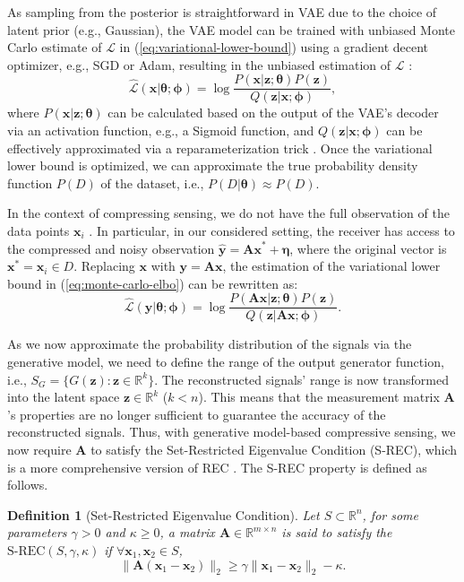 \documentclass[conference, 10pt]{IEEEtran}
\newtheorem{definition}{Definition}
\begin{document}
As sampling from the posterior is straightforward in VAE due to the choice of latent prior (e.g., Gaussian), the VAE model can be trained with unbiased Monte Carlo estimate of $\mathcal{L}$ in (\ref{eq:variational-lower-bound}) using a gradient decent optimizer, e.g., SGD or Adam, resulting in the unbiased estimation of $\mathcal{L}$ \cite{kingma2013auto}:
\begin{equation}
\label{eq:monte-carlo-elbo}
\mathcal{\hat{L}}(\mathbf{x}|\bm{\theta}; \bm{\phi}) = \log \frac{P(\mathbf{x}|\mathbf{z}; \bm{\theta}) P(\mathbf{z})}{Q (\mathbf{z}|\mathbf{x}; \bm{\phi})},
\end{equation}
where $P(\mathbf{x}|\mathbf{z}; \bm{\theta})$ can be calculated based on the output of the VAE's decoder via an activation function, e.g., a Sigmoid function, and $Q(\mathbf{z}|\mathbf{x}; \bm{\phi})$ can be effectively approximated via a reparameterization trick \cite{kingma2013auto}.
Once the variational lower bound is optimized, we can approximate the true probability density function $P(D)$ of the dataset, i.e., $P(D|\bm{\theta}) \approx P(D)$. 

In the context of compressing sensing, we do not have the full observation of the data points $\mathbf{x}_i$ \cite{foucart2013invitation}. In particular, in our considered setting, the receiver has access to the compressed and noisy observation $\mathbf{\hat{y}} = \mathbf{Ax}^* + \bm{\eta}$, where the original vector is $\mathbf{x}^* = \mathbf{x}_i \in D$. Replacing $\mathbf{x}$ with $\mathbf{y} = \mathbf{Ax}$, the estimation of the variational lower bound in (\ref{eq:monte-carlo-elbo}) can be rewritten as:
\begin{equation}
\mathcal{\hat{L}}(\mathbf{y}|\bm{\theta};\bm{\phi}) = \log \frac{P(\mathbf{Ax}|\mathbf{z};\bm{\theta}) P(\mathbf{z})}{Q(\mathbf{z}|\mathbf{Ax};\bm{\phi})}.
\end{equation}

As we now approximate the probability distribution of the signals via the generative model, we need to define the range of the output generator function, i.e., $S_G = \{G(\mathbf{z}): \mathbf{z} \in \mathbb{R}^k\}$.
The reconstructed signals' range is now transformed into the latent space $\mathbf{z} \in \mathbb{R}^k$ ($k < n$). This means that the measurement matrix $\mathbf{A}$'s properties are no longer sufficient to guarantee the accuracy of the reconstructed signals. Thus, with generative model-based compressive sensing, we now require $\mathbf{A}$ to satisfy the Set-Restricted Eigenvalue Condition (S-REC), which is a more comprehensive version of REC \cite{bora2017compressed}. The S-REC property is defined as follows.
\begin{definition}[Set-Restricted Eigenvalue Condition]
\label{def:s-rec}
Let $S \subset \mathbb{R}^n$, for some parameters $\gamma > 0$ and $\kappa \geq 0$, a matrix $\mathbf{A} \in \mathbb{R}^{m \times n}$ is said to satisfy the $\text{S-REC}(S, \gamma, \kappa)$ if $\forall \mathbf{x}_1, \mathbf{x}_2 \in S$,
\begin{equation*}
\|\mathbf{A}(\mathbf{x}_1 - \mathbf{x}_2)\|_2 \geq \gamma \|\mathbf{x}_1 - \mathbf{x}_2\|_2 - \kappa.
\end{equation*} 
\end{definition}
\end{document}
